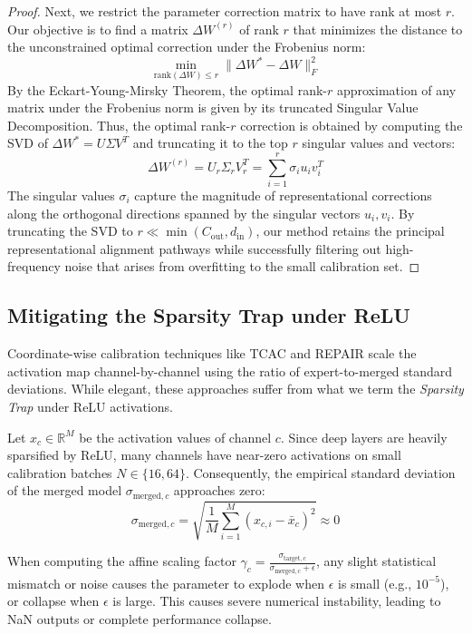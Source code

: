 \documentclass{article}
\theoremstyle{plain}
\theoremstyle{definition}
\theoremstyle{remark}
\begin{document}
\begin{proof}[Proof]
Next, we restrict the parameter correction matrix to have rank at most $r$. Our objective is to find a matrix $\Delta W^{(r)}$ of rank $r$ that minimizes the distance to the unconstrained optimal correction under the Frobenius norm:
\begin{equation}
  \min_{\text{rank}(\Delta W) \le r} \| \Delta W^* - \Delta W \|_F^2
\end{equation}
By the Eckart-Young-Mirsky Theorem, the optimal rank-$r$ approximation of any matrix under the Frobenius norm is given by its truncated Singular Value Decomposition. Thus, the optimal rank-$r$ correction is obtained by computing the SVD of $\Delta W^* = U \Sigma V^T$ and truncating it to the top $r$ singular values and vectors:
\begin{equation}
  \Delta W^{(r)} = U_r \Sigma_r V_r^T = \sum_{i=1}^r \sigma_i u_i v_i^T
\end{equation}
The singular values $\sigma_i$ capture the magnitude of representational corrections along the orthogonal directions spanned by the singular vectors $u_i, v_i$. By truncating the SVD to $r \ll \min(C_{\text{out}}, d_{\text{in}})$, our method retains the principal representational alignment pathways while successfully filtering out high-frequency noise that arises from overfitting to the small calibration set.
\end{proof}

\subsection{Mitigating the Sparsity Trap under ReLU}
Coordinate-wise calibration techniques like TCAC \cite{tcac2024} and REPAIR \cite{jordan2023repair} scale the activation map channel-by-channel using the ratio of expert-to-merged standard deviations. While elegant, these approaches suffer from what we term the \textit{Sparsity Trap} under ReLU activations.

Let $x_c \in \mathbb{R}^M$ be the activation values of channel $c$. Since deep layers are heavily sparsified by ReLU, many channels have near-zero activations on small calibration batches $N \in \{16, 64\}$. Consequently, the empirical standard deviation of the merged model $\sigma_{\text{merged}, c}$ approaches zero:
\begin{equation}
  \sigma_{\text{merged}, c} = \sqrt{\frac{1}{M} \sum_{i=1}^M (x_{c, i} - \bar{x}_c)^2} \approx 0
\end{equation}

When computing the affine scaling factor $\gamma_c = \frac{\sigma_{\text{target}, c}}{\sigma_{\text{merged}, c} + \epsilon}$, any slight statistical mismatch or noise causes the parameter to explode when $\epsilon$ is small (e.g., $10^{-5}$), or collapse when $\epsilon$ is large. This causes severe numerical instability, leading to NaN outputs or complete performance collapse.
\end{document}
